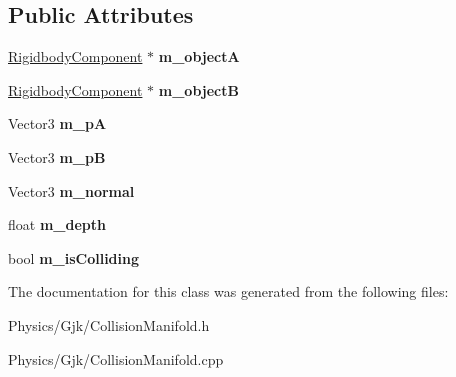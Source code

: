 \subsection*{Public Attributes}
\begin{DoxyCompactItemize}
\item 
\mbox{\label{classCollisionManifold_acc19a876530a865b75ed5c347aed8e16}} 
\hyperlink{classRigidbodyComponent}{Rigidbody\+Component} $\ast$ {\bfseries m\+\_\+objectA}
\item 
\mbox{\label{classCollisionManifold_a9687be8c297bde4d747befda177afbb6}} 
\hyperlink{classRigidbodyComponent}{Rigidbody\+Component} $\ast$ {\bfseries m\+\_\+objectB}
\item 
\mbox{\label{classCollisionManifold_aa6bee4bd56bf5cf54993eb68ae8e8a80}} 
Vector3 {\bfseries m\+\_\+pA}
\item 
\mbox{\label{classCollisionManifold_a99023627d612e6adf5d250332e8a5ea4}} 
Vector3 {\bfseries m\+\_\+pB}
\item 
\mbox{\label{classCollisionManifold_a0e49d92c5442e191fc72081c4000657e}} 
Vector3 {\bfseries m\+\_\+normal}
\item 
\mbox{\label{classCollisionManifold_a147ed5dd2971186308764d5faa640219}} 
float {\bfseries m\+\_\+depth}
\item 
\mbox{\label{classCollisionManifold_af352403a375481087f37f0e3a463d82f}} 
bool {\bfseries m\+\_\+is\+Colliding}
\end{DoxyCompactItemize}


The documentation for this class was generated from the following files\+:\begin{DoxyCompactItemize}
\item 
Physics/\+Gjk/Collision\+Manifold.\+h\item 
Physics/\+Gjk/Collision\+Manifold.\+cpp\end{DoxyCompactItemize}
